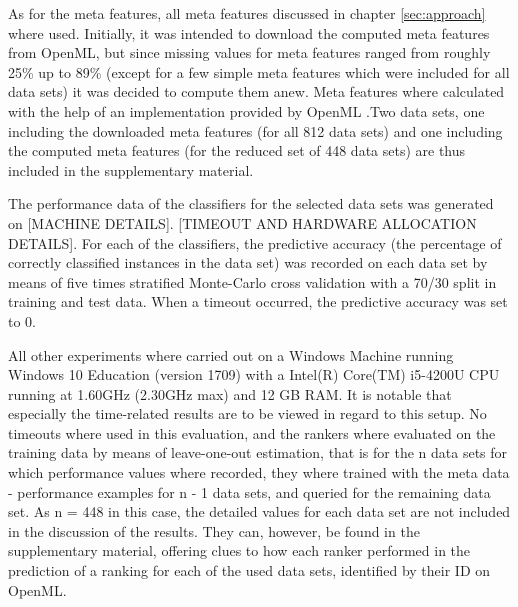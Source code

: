 
As for the meta features, all meta features discussed in chapter \ref{sec:approach} where used. Initially, it was intended to download the computed meta features from OpenML, but since missing values for meta features ranged from roughly 25\% up to 89\% (except for a few simple meta features which were included for all data sets) it was decided to compute them anew. Meta features where calculated with the help of an implementation provided by OpenML .Two data sets, one including the downloaded meta features (for all 812 data sets) and one including the computed meta features (for the reduced set of 448 data sets) are thus included in the supplementary material. 

The performance data of the classifiers for the selected data sets was generated on [MACHINE DETAILS]. [TIMEOUT AND HARDWARE ALLOCATION DETAILS]. For each of the classifiers, the predictive accuracy (the percentage of correctly classified instances in the data set) was recorded on each data set by means of five times stratified Monte-Carlo cross validation with a 70/30 split in training and test data. When a timeout occurred, the predictive accuracy was set to 0.

All other experiments where carried out on a Windows Machine running Windows 10 Education (version 1709) with a Intel(R) Core(TM) i5-4200U CPU running at 1.60GHz (2.30GHz max) and 12 GB RAM. It is notable that especially the time-related results are to be viewed in regard to this setup. No timeouts where used in this evaluation, and the rankers where evaluated on the training data by means of leave-one-out estimation, that is for the n data sets for which performance values where recorded, they where trained with the meta data - performance examples for n - 1 data sets, and queried for the remaining data set. As n = 448 in this case, the detailed values for each data set are not included in the discussion of the results. They can, however, be found in the supplementary material, offering clues to how each ranker performed in the prediction of a ranking for each of the used data sets, identified by their ID on OpenML. 

